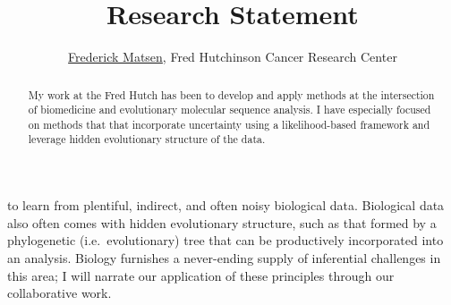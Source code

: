 \documentclass[hyper]{tufte-handout}
\title{Research Statement}
\author{\href{http://matsen.fredhutch.org/}{Frederick Matsen}, Fred Hutchinson Cancer Research Center}
\begin{document}
\maketitle

\begin{abstract}
\noindent
My work at the Fred Hutch has been to develop and apply methods at the intersection of biomedicine and evolutionary molecular sequence analysis.
I have especially focused on methods that that incorporate uncertainty using a likelihood-based framework and leverage hidden evolutionary structure of the data.
\end{abstract}


 to learn from plentiful, indirect, and often noisy biological data.
Biological data also often comes with hidden evolutionary structure, such as that formed by a phylogenetic (i.e.\ evolutionary) tree that can be productively incorporated into an analysis.
Biology furnishes a never-ending supply of inferential challenges in this area; I will narrate our application of these principles through our collaborative work.
\end{document}
